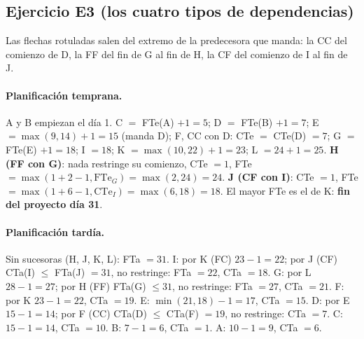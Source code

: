\documentclass[11pt,a4paper]{article}
\newcommand{\tnode}[9][tarea]{\node[#1,
  label={[temp,anchor=south west,inner sep=1pt]north west:#6},
  label={[temp,anchor=south east,inner sep=1pt]north east:#7},
  label={[tard,anchor=north west,inner sep=1pt]south west:#8},
  label={[tard,anchor=north east,inner sep=1pt]south east:#9}] (#2) at (#3) {\textbf{#4}\hspace{5mm}#5};}
\begin{document}
\subsection*{Ejercicio E3 (los cuatro tipos de dependencias)}
\begin{center}
\end{center}
Las flechas rotuladas salen del extremo de la predecesora que manda: la CC del comienzo de D, la FF del fin de G al
fin de H, la CF del comienzo de I al fin de J.

\paragraph{Planificación temprana.} A y B empiezan el día 1. C $=$ FTe(A) $+ 1 = 5$; D $=$ FTe(B) $+ 1 = 7$; E $=
\max(9, 14) + 1 = 15$ (manda D); F, CC con D: CTe $=$ CTe(D) $= 7$; G $=$ FTe(E) $+ 1 = 18$; I $= 18$; K $= \max(10,
22) + 1 = 23$; L $= 24 + 1 = 25$. \textbf{H (FF con G)}: nada restringe su comienzo, CTe $= 1$, FTe $= \max(1 + 2 -
1, \text{FTe}_G) = \max(2, 24) = 24$. \textbf{J (CF con I)}: CTe $= 1$, FTe $= \max(1 + 6 - 1, \text{CTe}_I) =
\max(6, 18) = 18$. El mayor FTe es el de K: \textbf{fin del proyecto día 31}.

\paragraph{Planificación tardía.} Sin sucesoras (H, J, K, L): FTa $= 31$. I: por K (FC) $23 - 1 = 22$; por J (CF)
CTa(I) $\le$ FTa(J) $= 31$, no restringe: FTa $= 22$, CTa $= 18$. G: por L $28 - 1 = 27$; por H (FF) FTa(G) $\le
31$, no restringe: FTa $= 27$, CTa $= 21$. F: por K $23 - 1 = 22$, CTa $= 19$. E: $\min(21, 18) - 1 = 17$, CTa
$= 15$. D: por E $15 - 1 = 14$; por F (CC) CTa(D) $\le$ CTa(F) $= 19$, no restringe: CTa $= 7$. C: $15 - 1 =
14$, CTa $= 10$. B: $7 - 1 = 6$, CTa $= 1$. A: $10 - 1 = 9$, CTa $= 6$.
\end{document}

